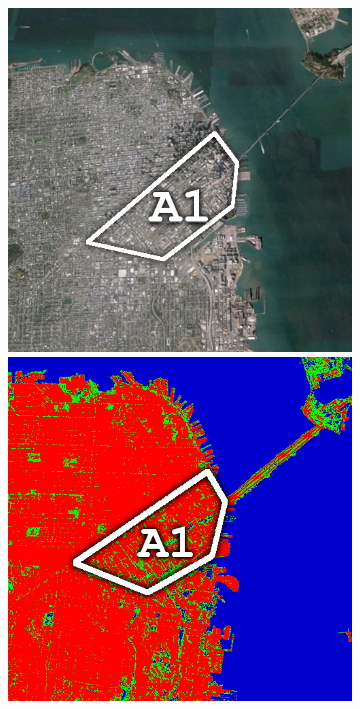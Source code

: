 \begin{figure}[!b]
\begin{subfigure}[t]{0.19\textwidth}
\includegraphics[width=\columnwidth]{Figures/ALOS2_SF_3Class/SouthMarketIm}  
\vspace{0.2cm}
\includegraphics[width=\columnwidth]{Figures/ALOS2_SF_3Class/SouthMarket}

\end{subfigure}
\end{figure}

